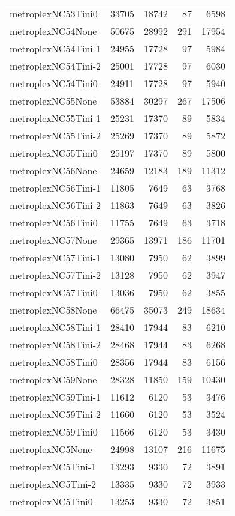 \begin{longtable}{lrrrr}
metroplexNC53Tini0 & 33705 & 18742 & 87 & 6598 \\
metroplexNC54None & 50675 & 28992 & 291 & 17954 \\
metroplexNC54Tini-1 & 24955 & 17728 & 97 & 5984 \\
metroplexNC54Tini-2 & 25001 & 17728 & 97 & 6030 \\
metroplexNC54Tini0 & 24911 & 17728 & 97 & 5940 \\
metroplexNC55None & 53884 & 30297 & 267 & 17506 \\
metroplexNC55Tini-1 & 25231 & 17370 & 89 & 5834 \\
metroplexNC55Tini-2 & 25269 & 17370 & 89 & 5872 \\
metroplexNC55Tini0 & 25197 & 17370 & 89 & 5800 \\
metroplexNC56None & 24659 & 12183 & 189 & 11312 \\
metroplexNC56Tini-1 & 11805 & 7649 & 63 & 3768 \\
metroplexNC56Tini-2 & 11863 & 7649 & 63 & 3826 \\
metroplexNC56Tini0 & 11755 & 7649 & 63 & 3718 \\
metroplexNC57None & 29365 & 13971 & 186 & 11701 \\
metroplexNC57Tini-1 & 13080 & 7950 & 62 & 3899 \\
metroplexNC57Tini-2 & 13128 & 7950 & 62 & 3947 \\
metroplexNC57Tini0 & 13036 & 7950 & 62 & 3855 \\
metroplexNC58None & 66475 & 35073 & 249 & 18634 \\
metroplexNC58Tini-1 & 28410 & 17944 & 83 & 6210 \\
metroplexNC58Tini-2 & 28468 & 17944 & 83 & 6268 \\
metroplexNC58Tini0 & 28356 & 17944 & 83 & 6156 \\
metroplexNC59None & 28328 & 11850 & 159 & 10430 \\
metroplexNC59Tini-1 & 11612 & 6120 & 53 & 3476 \\
metroplexNC59Tini-2 & 11660 & 6120 & 53 & 3524 \\
metroplexNC59Tini0 & 11566 & 6120 & 53 & 3430 \\
metroplexNC5None & 24998 & 13107 & 216 & 11675 \\
metroplexNC5Tini-1 & 13293 & 9330 & 72 & 3891 \\
metroplexNC5Tini-2 & 13335 & 9330 & 72 & 3933 \\
metroplexNC5Tini0 & 13253 & 9330 & 72 & 3851 \\

\end{longtable}
